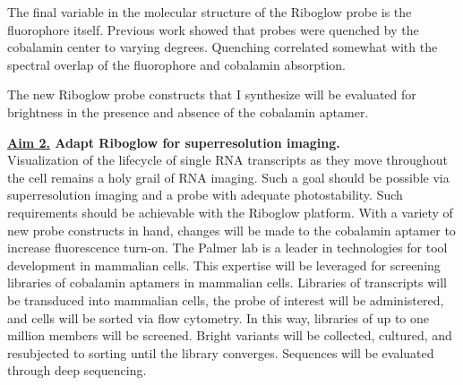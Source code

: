 The final variable in the molecular structure of the Riboglow probe is the fluorophore itself. Previous work showed that probes were quenched by the cobalamin center to varying degrees. Quenching correlated somewhat with the spectral overlap of the fluorophore and cobalamin absorption.

The new Riboglow probe constructs that I synthesize will be evaluated for brightness in the presence and absence of the cobalamin aptamer.

\textbf{\underline{Aim 2.} Adapt Riboglow for superresolution imaging.}\\
Visualization of the lifecycle of single RNA transcripts as they move throughout the cell remains a holy grail of RNA imaging.\comment{[Cite]} Such a goal should be possible via superresolution imaging and a probe with adequate photostability. Such requirements should be achievable with the Riboglow platform. With a variety of new probe constructs in hand, changes will be made to the cobalamin aptamer to increase fluorescence turn-on. The Palmer lab is a leader in technologies for tool development in mammalian cells.\cite{FiedlerDropletMicrofluidicFlow2017,DeanHighSpeedMultiparameterPhotophysical2015} This expertise will be leveraged for screening libraries of cobalamin aptamers in mammalian cells. Libraries of transcripts will be transduced into mammalian cells, the probe of interest will be administered, and cells will be sorted via flow cytometry.
In this way, libraries of up to one million members will be screened. Bright variants will be collected, cultured, and resubjected to sorting until the library converges. Sequences will be evaluated through deep sequencing.

